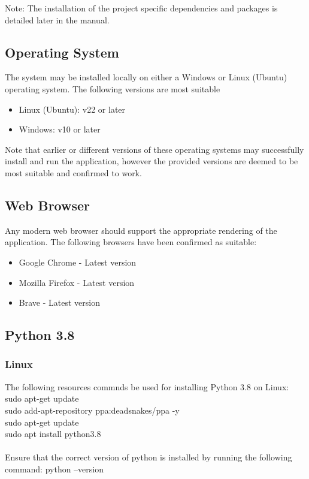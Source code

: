 \documentclass{article}
\begin{document}
Note: The installation of the project specific dependencies and packages is detailed later in the manual.

\subsection{Operating System}
The system may be installed locally on either a Windows or Linux (Ubuntu) operating system. The following versions are most suitable
\begin{itemize}
    \item Linux (Ubuntu): v22 or later
    \item Windows: v10 or later
\end{itemize}
Note that earlier or different versions of these operating systems may successfully install and run the application, however the provided
versions are deemed to be most suitable and confirmed to work.

\subsection{Web Browser}
Any modern web browser should support the appropriate rendering of the application. The following browsers have been confirmed as suitable:
\begin{itemize}
    \item Google Chrome - Latest version
    \item Mozilla Firefox - Latest version
    \item Brave - Latest version
\end{itemize}

\subsection{Python 3.8}
\subsubsection{Linux}
The following resources commnds be used for installing Python 3.8 on Linux:\\
sudo apt-get update\\
sudo add-apt-repository ppa:deadsnakes/ppa -y\\
sudo apt-get update\\
sudo apt install python3.8\\ \\
Ensure that the correct version of python is installed by running the following command:
python --version
\end{document}
